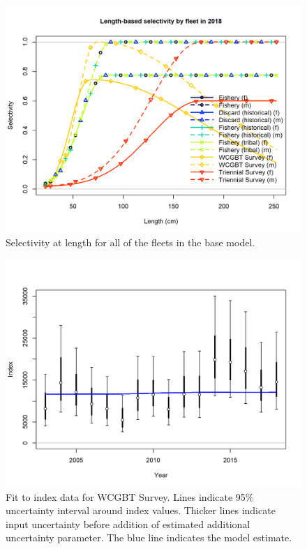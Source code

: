 \documentclass[12pt,]{article}
\begin{document}
\newpage

\FloatBarrier

\FloatBarrier

\FloatBarrier

\FloatBarrier

\begin{figure}
\centering
\includegraphics{r4ss/plots_mod1/sel01_multiple_fleets_length1.png}
\caption{Selectivity at length for all of the fleets in the base model.
\label{fig:sel01_multiple_fleets_length1}}
\end{figure}

\FloatBarrier

\begin{figure}
\centering
\includegraphics{r4ss/plots_mod1/index2_cpuefit_WCGBT Survey.png}
\caption{Fit to index data for WCGBT Survey. Lines indicate 95\%
uncertainty interval around index values. Thicker lines indicate input
uncertainty before addition of estimated additional uncertainty
parameter. The blue line indicates the model
estimate.\label{fig:index2_cpuefit_WCGBTS}}
\end{figure}
\end{document}

